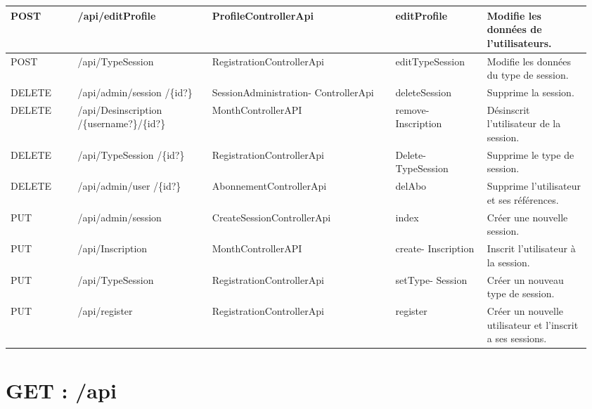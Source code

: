 		\newpage
			\begin{center}
				\begin{tabularx}{1.11\textwidth}{| T{0.11\linewidth} | S{0.22\linewidth} | S{0.3\linewidth} | S{0.151\linewidth} | S{0.175\linewidth} |}
					\hline
						POST & /api/editProfile & ProfileControllerApi & editProfile & Modifie les données de l'utilisateurs. \\
					\hline
						POST & /api/TypeSession & RegistrationControllerApi & editTypeSession & Modifie les données du type de session. \\
					\hline
					
					\hline
					
					\hline
						DELETE & /api/admin/session /\{id?\} & SessionAdministration- ControllerApi & deleteSession & Supprime la session. \\
					\hline
						DELETE & /api/Desinscription /\{username?\}/\{id?\} & MonthControllerAPI & remove- Inscription & Désinscrit l'utilisateur de la session. \\
					\hline
						DELETE & /api/TypeSession /\{id?\} & RegistrationControllerApi & Delete- TypeSession & Supprime le type de session. \\
					\hline
						DELETE & /api/admin/user /\{id?\} & AbonnementControllerApi & delAbo & Supprime l'utilisateur et ses références. \\
					\hline
			
					\hline
			
					\hline
						PUT & /api/admin/session & CreateSessionControllerApi & index & Créer une nouvelle session. \\
					\hline
						PUT & /api/Inscription & MonthControllerAPI & create- Inscription & Inscrit l'utilisateur à la session. \\
					\hline
						PUT & /api/TypeSession & RegistrationControllerApi & setType- Session & Créer un nouveau type de session. \\
					\hline
						PUT & /api/register & RegistrationControllerApi & register & Créer un nouvelle utilisateur et l'inscrit a ses sessions. \\
					\hline
				\end{tabularx}
			\end{center}


\newpage
\section{GET : /api}
	


